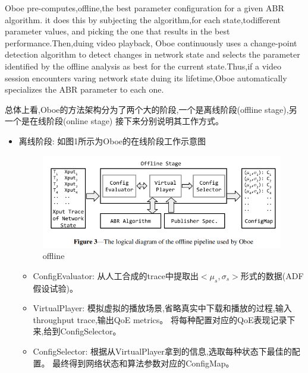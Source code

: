 \documentclass{\SetClass}
\begin{document}
    \par Oboe pre-computes,offline,the best parameter configuration for a given ABR algorithm.
    it does this by subjecting the algorithm,for each state,todifferent parameter values, and picking the 
    one that results in the best performance.Then,duing video playback, Oboe continuously uses a change-point 
    detection algorithm to detect changes in network state and selects the parameter identified by the offline 
    analysis as best for the current state.Thus,if a video session encounters varing network state duing its
    lifetime,Oboe automatically specializes the ABR parameter to each one.
    \par 总体上看,Oboe的方法架构分为了两个大的阶段,一个是离线阶段(offline stage),另一个是在线阶段(online stage)
    接下来分别说明其工作方式。
    \begin{itemize}

        \item 离线阶段: 如图1所示为Oboe的在线阶段工作示意图
        \begin{figure}[!h]
            \centering
            \includegraphics[scale=0.6]{./Fig/offline.png}
            \caption{offline}
            \label{fig:1}
        \end{figure}
        \begin{itemize}
            \item ConfigEvaluator: 从人工合成的trace中提取出$<\mu_s,\sigma_s>$形式的数据(ADF假设试验)。
            
            \item VirtualPlayer: 模拟虚拟的播放场景,省略真实中下载和播放的过程,输入throughput trace,输出QoE metrics。
            将每种配置对应的QoE表现记录下来,给到ConfigSelector。
            
            \item ConfigSelector: 根据从VirtualPlayer拿到的信息,选取每种状态下最佳的配置。
            最终得到网络状态和算法参数对应的ConfigMap。
            

\end{itemize}
\end{itemize}
\end{document}
